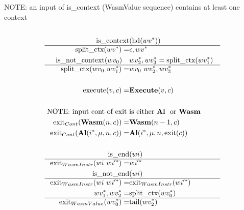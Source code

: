 NOTE: an input of is\_context (WasmValue sequence) contains at least one context
\begin{align*}
%
\newline \\
  \text{is\_context}&(\text{hd}(\seq{wv})) \\
  \hline
  \text{split\_ctx}(\seq{wv}) =& \epsilon, \seq{wv} \\
%
  \text{is\_not\_context}(wv_0) \quad& \seq{wv_2}, \seq{wv_3} = \text{split\_ctx}(\seq{wv_1}) \\
  \hline
  \text{split\_ctx}(wv_0 ~ \seq{wv_1}) =& wv_0 ~ \seq{wv_2}, \seq{wv_3} \\
%
\newline \\
  \text{execute}(v, c) =& \exe(v, c) \\
%
\newline \\
\text{
  NOTE: input cont of exit }&\text{is either \al ~ or \wasm
} \\
  \text{exit}_{Cont}(\wasm (n, c)) =& \wasm(n-1, c) \\
%
  \text{exit}_{Cont}(\al (\seq i, \mu, n, c)) =& \al (\seq i, \mu, n, \text{exit}(c)) \\
%
\newline \\
  \text{is\_end}&(wi) \\
  \hline
  \text{exit}_{WasmInstr}(wi ~ \seq{wi'}) =& \seq{wi'} \\
%
  \text{is\_not\_end}&(wi) \\
  \hline
  \text{exit}_{WasmInstr}(wi ~ \seq{wi'}) =& \text{exit}_{WasmInstr}(\seq{wi'}) \\
%
  \seq{wv_1}, \seq{wv_2} =& \text{split\_ctx}(\seq{wv_0}) \\
  \hline
  \text{exit}_{WasmValue}(\seq{wv_0}) =& \text{tail}(\seq{wv_2}) \\
\end{align*}





